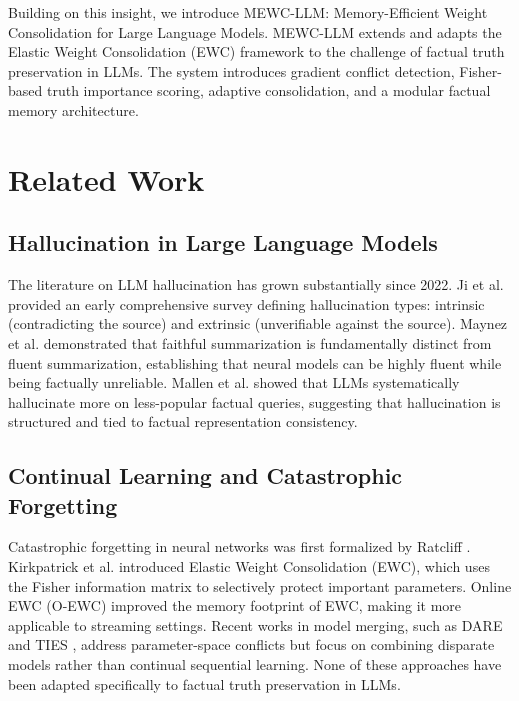 \documentclass[10pt, conference, letterpaper]{IEEEtran}
\begin{document}
Building on this insight, we introduce MEWC-LLM: Memory-Efficient Weight Consolidation for Large Language Models. MEWC-LLM extends and adapts the Elastic Weight Consolidation (EWC) framework \cite{kirkpatrick2017overcoming} to the challenge of factual truth preservation in LLMs. The system introduces gradient conflict detection, Fisher-based truth importance scoring, adaptive consolidation, and a modular factual memory architecture. 

\section{Related Work}

\subsection{Hallucination in Large Language Models}
The literature on LLM hallucination has grown substantially since 2022. Ji et al. \cite{ji2023survey} provided an early comprehensive survey defining hallucination types: intrinsic (contradicting the source) and extrinsic (unverifiable against the source). Maynez et al. \cite{maynez2020faithfulness} demonstrated that faithful summarization is fundamentally distinct from fluent summarization, establishing that neural models can be highly fluent while being factually unreliable. Mallen et al. \cite{mallen2023when} showed that LLMs systematically hallucinate more on less-popular factual queries, suggesting that hallucination is structured and tied to factual representation consistency.

\subsection{Continual Learning and Catastrophic Forgetting}
Catastrophic forgetting in neural networks was first formalized by Ratcliff \cite{ratcliff1990connectionist}. Kirkpatrick et al. \cite{kirkpatrick2017overcoming} introduced Elastic Weight Consolidation (EWC), which uses the Fisher information matrix to selectively protect important parameters. Online EWC (O-EWC) \cite{chaudhry2018riemannian} improved the memory footprint of EWC, making it more applicable to streaming settings. Recent works in model merging, such as DARE \cite{yu2023language} and TIES \cite{yadav2023ties}, address parameter-space conflicts but focus on combining disparate models rather than continual sequential learning. None of these approaches have been adapted specifically to factual truth preservation in LLMs.
\end{document}
